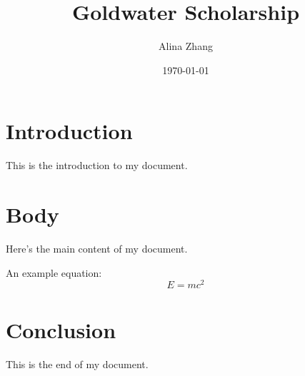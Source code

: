 \documentclass[12pt]{article}
\title{Goldwater Scholarship}
\author{Alina Zhang}
\date{\today}           %
\begin{document}
\maketitle              %

\section{Introduction}
This is the introduction to my document.

\section{Body}

Here's the main content of my document. 

An example equation:
\begin{equation}
    E = mc^2
\end{equation}

\section{Conclusion}
This is the end of my document.
\end{document}
